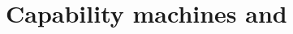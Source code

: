 \documentclass[aspectratio=169]{beamer}
\begin{document}

    
    
    
\section{Capability machines and \stktokens{}}
\end{document}
